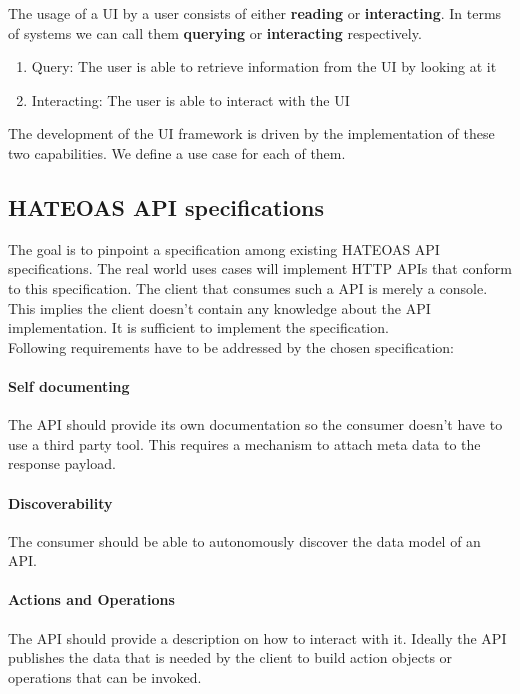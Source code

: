 The usage of a UI by a user consists of either \textbf{reading} or \textbf{interacting}. In terms of systems we can call them \textbf{querying} or \textbf{interacting} respectively.

\begin{enumerate}
  \item Query: The user is able to retrieve information from the UI by looking at it
  \item Interacting: The user is able to interact with the UI
\end{enumerate}

The development of the UI framework is driven by the implementation of these two capabilities. We define a use case for each of them.

\subsection{HATEOAS API specifications}
The goal is to pinpoint a specification among existing HATEOAS API specifications. The real world uses cases will implement HTTP APIs that conform to this specification. The client that consumes such a API is merely a console. This implies the client doesn't contain any knowledge about the API implementation. It is sufficient to implement the specification. \\
Following requirements have to be addressed by the chosen specification:

\paragraph{Self documenting}
The API should provide its own documentation so the consumer doesn't have to use a third party tool. This requires a mechanism to attach meta data to the response payload.

\paragraph{Discoverability}
The consumer should be able to autonomously discover the data model of an API.

\paragraph{Actions and Operations}
The API should provide a description on how to interact with it. Ideally the API publishes the data that is needed by the client to build action objects or operations that can be invoked.

